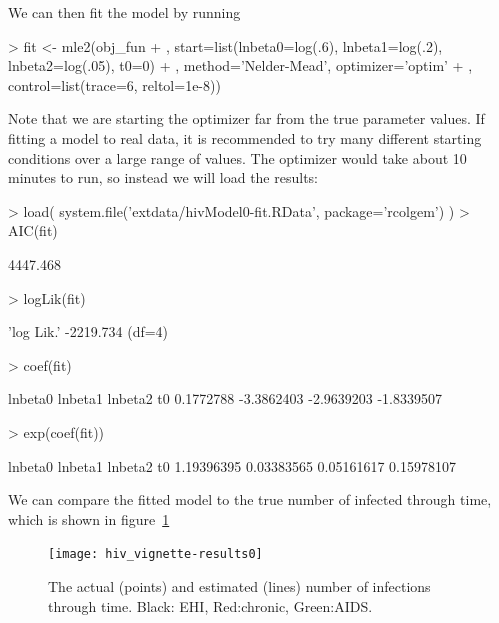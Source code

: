 \documentclass{article}
\begin{document}
We can then fit the model by running
\begin{Schunk}
\begin{Sinput}
> fit <- mle2(obj_fun
+   , start=list(lnbeta0=log(.6), lnbeta1=log(.2), lnbeta2=log(.05), t0=0)
+   , method='Nelder-Mead', optimizer='optim' 
+   ,  control=list(trace=6, reltol=1e-8))
\end{Sinput}
\end{Schunk}
Note that we are starting the optimizer far from the true parameter values.
If fitting a model to real data, it is recommended to try many different starting conditions over a large range of values.  
The optimizer would take about 10 minutes to run, so instead we will load the results:
\begin{Schunk}
\begin{Sinput}
> load( system.file('extdata/hivModel0-fit.RData', package='rcolgem') )
> AIC(fit)
\end{Sinput}
\begin{Soutput}
[1] 4447.468
\end{Soutput}
\begin{Sinput}
> logLik(fit)
\end{Sinput}
\begin{Soutput}
'log Lik.' -2219.734 (df=4)
\end{Soutput}
\begin{Sinput}
> coef(fit)
\end{Sinput}
\begin{Soutput}
   lnbeta0    lnbeta1    lnbeta2         t0 
 0.1772788 -3.3862403 -2.9639203 -1.8339507 
\end{Soutput}
\begin{Sinput}
> exp(coef(fit))
\end{Sinput}
\begin{Soutput}
   lnbeta0    lnbeta1    lnbeta2         t0 
1.19396395 0.03383565 0.05161617 0.15978107 
\end{Soutput}
\end{Schunk}


We can compare the fitted model to the true number of infected through time, which is shown in figure~\ref{fig:results0}
\begin{figure}
	\begin{center}
\texttt{[image: hiv\_vignette-results0]}
	\end{center}
	\caption{The actual (points) and estimated (lines) number of infections through time. Black: EHI, Red:chronic, Green:AIDS. 
		\label{fig:results0}}
\end{figure}
\end{document}
